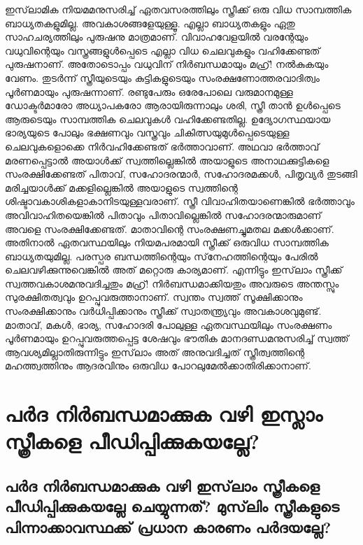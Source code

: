 ഇസ്‌ലാമിക നിയമമനുസരിച്ച് ഏതവസരത്തിലും സ്ത്രീക്ക് ഒരു വിധ സാമ്പത്തിക ബാധ്യതകളുമില്ല. അവകാശങ്ങളേയുള്ളൂ. എല്ലാ ബാധ്യതകളും ഏതു സാഹചര്യത്തിലും പുരുഷനു മാത്രമാണ്. വിവാഹവേളയില്‍ വരന്റേയും വധുവിന്റെയും വസ്ത്രങ്ങളുള്‍പ്പെടെ എല്ലാ വിധ ചെലവുകളും വഹിക്കേണ്ടത് പുരുഷനാണ്. അതോടൊപ്പം വധുവിന് നിര്‍ബന്ധമായും മഹ്ര്! നല്‍കുകയും വേണം. തുടര്‍ന്ന് സ്ത്രീയുടെയും കുട്ടികളുടെയും സംരക്ഷണോത്തരവാദിത്വം പൂര്‍ണമായും പുരുഷന്നാണ്. രണ്ടുപേരും ഒരേപോലെ വരുമാനമുള്ള ഡോക്ടര്‍മാരോ അധ്യാപകരോ ആരായിരുന്നാലും ശരി, സ്ത്രീ താന്‍ ഉള്‍പ്പെടെ ആരുടെയും സാമ്പത്തിക ചെലവുകള്‍ വഹിക്കേണ്ടതില്ല. ഉദ്യോഗസ്ഥയായ ഭാര്യയുടെ പോലും ഭക്ഷണവും വസ്ത്രവും ചികിത്സയുമുള്‍പ്പെടെയുള്ള ചെലവുകളൊക്കെ നിര്‍വഹിക്കേണ്ടത് ഭര്‍ത്താവാണ്. അഥവാ ഭര്‍ത്താവ് മരണപ്പെട്ടാല്‍ അയാള്‍ക്ക് സ്വത്തില്ലെങ്കില്‍ അയാളുടെ അനാഥക്കുട്ടികളെ സംരക്ഷിക്കേണ്ടത് പിതാവ്, സഹോദരന്മാര്‍, സഹോദരമക്കള്‍, പിതൃവ്യര്‍ തുടങ്ങി മരിച്ചയാള്‍ക്ക് മക്കളില്ലെങ്കില്‍ അയാളുടെ സ്വത്തിന്റെ ശിഷ്ടാവകാശികളാകാനിടയുള്ളവരാണ്. സ്ത്രീ വിവാഹിതയാണെങ്കില്‍ ഭര്‍ത്താവും അവിവാഹിതയെങ്കില്‍ പിതാവും പിതാവില്ലെങ്കില്‍ സഹോദരന്മാരുമാണ് അവളെ സംരക്ഷിക്കേണ്ടത്. മാതാവിന്റെ സംരക്ഷണച്ചുമതല മക്കള്‍ക്കാണ്. അതിനാല്‍ ഏതവസ്ഥയിലും നിയമപരമായി സ്ത്രീക്ക് ഒരുവിധ സാമ്പത്തിക ബാധ്യതയുമില്ല. പരസ്പര ബന്ധത്തിന്റെയും സ്‌നേഹത്തിന്റെയും പേരില്‍ ചെലവഴിക്കുന്നുവെങ്കില്‍ അത് മറ്റൊരു കാര്യമാണ്. എന്നിട്ടും ഇസ്‌ലാം സ്ത്രീക്ക് സ്വത്തവകാശമനുവദിച്ചതും മഹ്ര്! നിര്‍ബന്ധമാക്കിയതും അവരുടെ അന്തസ്സും സുരക്ഷിതത്വവും ഉറപ്പുവരുത്താനാണ്. സ്വന്തം സ്വത്ത് സൂക്ഷിക്കാനും സംരക്ഷിക്കാനും വര്‍ധിപ്പിക്കാനും സ്ത്രീക്ക് സ്വാതന്ത്യ്രവും അവകാശവുമുണ്ട്. മാതാവ്, മകള്‍, ഭാര്യ, സഹോദരി പോലുള്ള ഏതവസ്ഥയിലും സംരക്ഷണം പൂര്‍ണമായും ഉറപ്പുവരുത്തപ്പെട്ട ശേഷവും ഭൗതിക മാനദണ്ഡമനുസരിച്ച് സ്വത്ത് ആവശ്യമില്ലാതിരുന്നിട്ടും ഇസ്‌ലാം അത് അനുവദിച്ചത് സ്ത്രീത്വത്തിന്റെ മഹത്ത്വത്തിനും ആദരവിനും ഒരുവിധ പോറലുമേല്‍ക്കാതിരിക്കാനാണ്. 
\chapter{പര്‍ദ നിര്‍ബന്ധമാക്കുക വഴി ഇസ്ലാം സ്ത്രീകളെ പീഡിപ്പിക്കുകയല്ലേ? }
\section{പര്‍ദ നിര്‍ബന്ധമാക്കുക വഴി ഇസ്‌ലാം സ്ത്രീകളെ പീഡിപ്പിക്കുകയല്ലേ ചെയ്യുന്നത്? മുസ്‌ലിം സ്ത്രീകളുടെ പിന്നാക്കാവസ്ഥക്ക് പ്രധാന കാരണം പര്‍ദയല്ലേ?}


